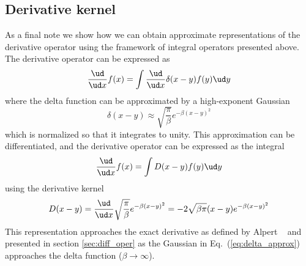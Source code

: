 \subsection{Derivative kernel}
As a final note we show how we can obtain approximate representations of the 
derivative operator using the framework of integral operators presented above. 
The derivative operator can be expressed as
\begin{equation}
    \frac{\ud}{\ud x} f(x) = \int \frac{\ud}{\ud x} \delta(x-y) f(y) \ud y
\end{equation}
where the delta function can be approximated by a high-exponent Gaussian
\begin{equation}
    \label{eq:delta_approx}
    \delta(x-y) \approx \sqrt{\frac{\pi}{\beta}} e^{-\beta (x-y)^2}
\end{equation}
which is normalized so that it integrates to unity. This approximation can be 
differentiated, and the derivative operator can be expressed as the integral
\begin{equation}
    \frac{\ud}{\ud x} f(x) = \int D(x-y)f(y) \ud y
\end{equation}
using the derivative kernel
\begin{equation}
    D(x-y)  = \frac{\ud}{\ud x} \sqrt{\frac{\pi}{\beta}}e^{-\beta (x-y)^2} 
	    = -2 \sqrt{\beta\pi}(x-y)e^{-\beta (x-y)^2}
\end{equation}
This representation approaches the exact derivative as defined by Alpert 
\etal~\cite{Alpert} and presented in section \ref{sec:diff_oper} as the Gaussian 
in Eq.~(\ref{eq:delta_approx}) approaches the delta function ($\beta \rightarrow \infty$).

